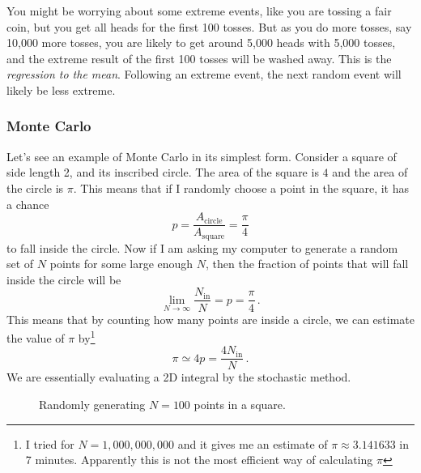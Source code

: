 \documentclass{article}
\theoremstyle{plain}\theoremheaderfont{\normalfont\itshape}\theorembodyfont{\rmfamily}\theoremseparator{.}\newtheorem*{rem}{Remark}\newtheorem*{ex}{Example}\newtheorem*{proof}{Proof}\newtheorem*{altp}{Alternative proof}
\theoremstyle{plain}\theoremheaderfont{\normalfont\bfseries}\theorembodyfont{\rmfamily}\theoremseparator{.}\newtheorem{thm}{Theorem}[section]\newtheorem{lem}[thm]{Lemma}\newtheorem{prop}[thm]{Proposition}\newtheorem*{cor}{Corollary}\newtheorem{defn}[thm]{Definition}\newtheorem{clm}[thm]{Claim}\newtheorem{clminproof}{Claim}\newtheorem{alg}[thm]{Algorithm}\newtheorem{hyp}[thm]{Hypothesis}\newtheorem{law}[thm]{Law}
\theoremstyle{break}\theoremheaderfont{\normalfont\itshape}\theorembodyfont{\rmfamily}\theoremseparator{.\medskip}\newtheorem*{proofskip}{Proof}\newtheorem*{exs}{Examples}\newtheorem*{rems}{Remarks}
\theoremstyle{break}\theoremheaderfont{\normalfont\bfseries}\theorembodyfont{\rmfamily}\theoremseparator{.\medskip}\newtheorem{lemskip}[thm]{Lemma}\newtheorem{defnskip}[thm]{Definition}\newtheorem{propskip}[thm]{Proposition}\newtheorem{thmskip}[thm]{Theorem}
\numberwithin{equation}{section}
\begin{document}
    You might be worrying about some extreme events, like you are tossing a fair coin, but you get all heads for the first 100 tosses. But as you do more tosses, say 10,000 more tosses, you are likely to get around 5,000 heads with 5,000 tosses, and the extreme result of the first 100 tosses will be washed away. This is the \textit{regression to the mean}. Following an extreme event, the next random event will likely be less extreme.

    \subsubsection{Monte Carlo}
    Let's see an example of Monte Carlo in its simplest form. Consider a square of side length 2, and its inscribed circle. The area of the square is \(4\) and the area of the circle is \(\pi\). This means that if I randomly choose a point in the square, it has a chance
    \begin{equation}
        p=\frac{A_{\text{circle}}}{A_{\text{square}}}=\frac{\pi}{4}
    \end{equation}
    to fall inside the circle. Now if I am asking my computer to generate a random set of \(N\) points for some large enough \(N\), then the  fraction of points that will fall inside the circle will be
    \begin{equation}
        \lim_{N\to\infty}\frac{N_{\text{in}}}{N}=p=\frac{\pi}{4}\,.
    \end{equation}
    This means that by counting how many points are inside a circle, we can estimate the value of \(\pi\) by\footnote{I tried for \(N=1,000,000,000\) and it gives me an estimate of \(\pi\approx 3.141633\) in 7 minutes. Apparently this is not the most efficient way of calculating \(\pi\)}
    \begin{equation}
        \pi\simeq 4p=\frac{4N_{\text{in}}}{N}\,.
    \end{equation}
    We are essentially evaluating a 2D integral by the stochastic method.

    \begin{figure}
        \centering
        \caption{Randomly generating \(N=100\) points in a square.}
    \end{figure}
\end{document}
